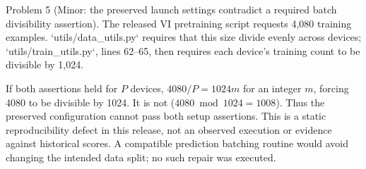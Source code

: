 \documentclass[10pt]{article}
\begin{document}
Problem 5 (Minor: the preserved launch settings contradict a required batch divisibility assertion).  The released VI pretraining script requests 4,080 training examples. `utils/data\_utils.py` requires that this size divide evenly across devices; `utils/train\_utils.py`, lines 62–65, then requires each device’s training count to be divisible by 1,024.\par
If both assertions held for \(P\) devices, \(4080/P=1024m\) for an integer \(m\), forcing 4080 to be divisible by 1024. It is not (\(4080\bmod1024=1008\)). Thus the preserved configuration cannot pass both setup assertions. This is a static reproducibility defect in this release, not an observed execution or evidence against historical scores. A compatible prediction batching routine would avoid changing the intended data split; no such repair was executed.\par
\end{document}
